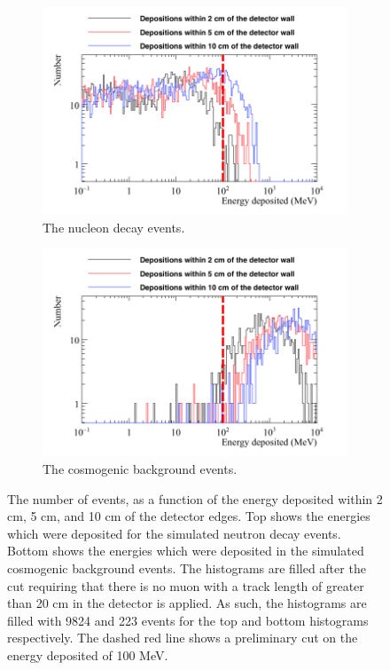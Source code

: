 \begin{figure}[h!]
  \centering
  \begin{subfigure}{0.75\textwidth}
    \centering
    \includegraphics[width=\textwidth]{NucleonDecay_EDepNearEdges}
    \caption{The nucleon decay events.}
  \end{subfigure}
  \begin{subfigure}{0.75\textwidth}
    \centering
    \includegraphics[width=\textwidth]{CosmicBackground_EDepNearEdges}
    \caption{The cosmogenic background events.}
  \end{subfigure}
  \caption[The number of events, as a function of the energy deposited within 2 cm, 5 cm, and 10 cm of the detector edges.]
          {The number of events, as a function of the energy deposited within 2 cm, 5 cm, and 10 cm of the detector edges. Top shows the energies which were deposited for the simulated neutron decay events. Bottom shows the energies which were deposited in the simulated cosmogenic background events. The histograms are filled after the cut requiring that there is no muon with a track length of greater than 20 cm in the detector is applied. As such, the histograms are filled with 9824 and 223 events for the top and bottom histograms respectively. The dashed red line shows a preliminary cut on the energy deposited of 100 MeV.}
  \label{fig:NDK_EDepNearEdge}
\end{figure}

